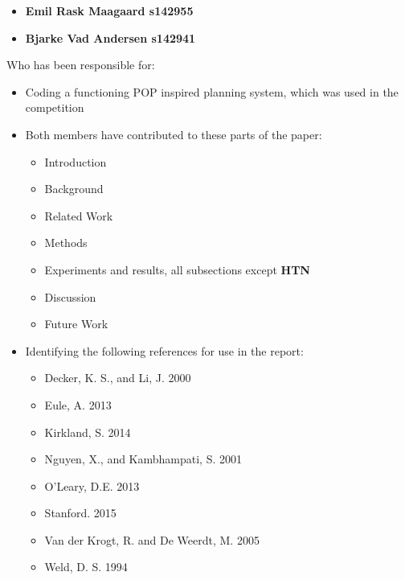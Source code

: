 \documentclass[letterpaper]{article}
\begin{document}
\begin{itemize}
\item \textbf{Emil Rask Maagaard s142955}
\item \textbf{Bjarke Vad Andersen s142941}
\end{itemize}

Who has been responsible for:
\begin{itemize}
\item Coding a functioning POP inspired planning system, which was used in the competition
\item Both members have contributed to these parts of the paper:
  \begin{itemize}
  \item Introduction
  \item Background
  \item Related Work
  \item Methods
  \item Experiments and results, all subsections except \textbf{HTN}
  \item Discussion
  \item Future Work
  \end{itemize}
\item Identifying the following references for use in the report:
  \begin{itemize}
  \item Decker, K. S., and Li, J. 2000
  \item Eule, A. 2013
  \item Kirkland, S. 2014
  \item Nguyen, X., and Kambhampati, S. 2001
  \item O'Leary, D.E. 2013
  \item Stanford. 2015
  \item Van der Krogt, R. and De Weerdt, M. 2005
  \item Weld, D. S. 1994
  \end{itemize}
\end{itemize}

\vspace{1cm}
\end{document}
